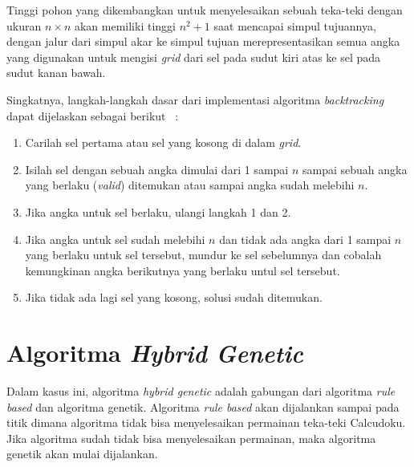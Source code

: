 Tinggi pohon yang dikembangkan untuk menyelesaikan sebuah teka-teki dengan ukuran \begin{math}n \times n\end{math} akan memiliki tinggi \begin{math}n^2+1\end{math} saat mencapai simpul tujuannya, dengan jalur dari simpul akar ke simpul tujuan merepresentasikan semua angka yang digunakan untuk mengisi \textit{grid} dari sel pada sudut kiri atas ke sel pada sudut kanan bawah.

Singkatnya, langkah-langkah dasar dari implementasi algoritma \textit{backtracking} dapat dijelaskan sebagai berikut ~\cite{fahda:16:backtracking}:
\begin{enumerate}
\item Carilah sel pertama atau sel yang kosong di dalam \textit{grid}.
\item Isilah sel dengan sebuah angka dimulai dari 1 sampai \begin{math}n\end{math} sampai sebuah angka yang berlaku (\textit{valid}) ditemukan atau sampai angka sudah melebihi \begin{math}n\end{math}.
\item Jika angka untuk sel berlaku, ulangi langkah 1 dan 2.
\item Jika angka untuk sel sudah melebihi \begin{math}n\end{math} dan tidak ada angka dari 1 sampai \begin{math}n\end{math} yang berlaku untuk sel tersebut, mundur ke sel sebelumnya dan cobalah kemungkinan angka berikutnya yang berlaku untul sel tersebut.
\item Jika tidak ada lagi sel yang kosong, solusi sudah ditemukan.
\end{enumerate}

\section{Algoritma \textit{Hybrid Genetic} ~\cite{johanna:12:hybrid}}
\label{sec:hybridgenetic}

Dalam kasus ini, algoritma \textit{hybrid genetic} adalah gabungan dari algoritma \textit{rule based} dan algoritma genetik. Algoritma \textit{rule based} akan dijalankan sampai pada titik dimana algoritma tidak bisa menyelesaikan permainan teka-teki Calcudoku. Jika algoritma sudah tidak bisa menyelesaikan permainan, maka algoritma genetik akan mulai dijalankan.

